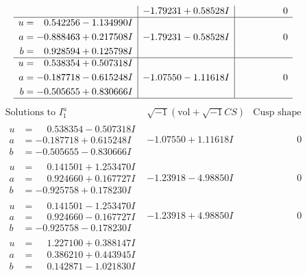 \documentclass[1p]{elsarticle_modified}
\theoremstyle{definition}
\newcommand{\I}{\sqrt{-1}}
\begin{document}
$$\begin{array}{c|c|c}
 & -1.79231 + 0.58528 I & \phantom{-0.000000 } 0 \\ \hline\begin{aligned}
u &= \phantom{-}0.542256 - 1.134990 I \\
a &= -0.888463 + 0.217508 I \\
b &= \phantom{-}0.928594 + 0.125798 I\end{aligned}
 & -1.79231 - 0.58528 I & \phantom{-0.000000 } 0 \\ \hline\begin{aligned}
u &= \phantom{-}0.538354 + 0.507318 I \\
a &= -0.187718 - 0.615248 I \\
b &= -0.505655 + 0.830666 I\end{aligned}
 & -1.07550 - 1.11618 I & \phantom{-0.000000 } 0\\
 \hline 
 \end{array}$$\newpage$$\begin{array}{c|c|c}  
\text{Solutions to }I^u_{1}& \I (\text{vol} + \sqrt{-1}CS) & \text{Cusp shape}\\
 \hline 
\begin{aligned}
u &= \phantom{-}0.538354 - 0.507318 I \\
a &= -0.187718 + 0.615248 I \\
b &= -0.505655 - 0.830666 I\end{aligned}
 & -1.07550 + 1.11618 I & \phantom{-0.000000 } 0 \\ \hline\begin{aligned}
u &= \phantom{-}0.141501 + 1.253470 I \\
a &= \phantom{-}0.924660 + 0.167727 I \\
b &= -0.925758 + 0.178230 I\end{aligned}
 & -1.23918 - 4.98850 I & \phantom{-0.000000 } 0 \\ \hline\begin{aligned}
u &= \phantom{-}0.141501 - 1.253470 I \\
a &= \phantom{-}0.924660 - 0.167727 I \\
b &= -0.925758 - 0.178230 I\end{aligned}
 & -1.23918 + 4.98850 I & \phantom{-0.000000 } 0 \\ \hline\begin{aligned}
u &= \phantom{-}1.227100 + 0.388147 I \\
a &= \phantom{-}0.386210 + 0.443945 I \\
b &= \phantom{-}0.142871 - 1.021830 I\end{aligned}

\end{array}$$
\end{document}
